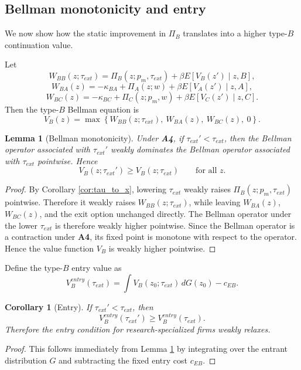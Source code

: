 \documentclass[12pt]{article}
\newtheorem{lemma}{Lemma}
\newtheorem{corollary}{Corollary}
\begin{document}
\subsection{Bellman monotonicity and entry}

We now show how the static improvement in \(\Pi_B\) translates into a higher type-\(B\) continuation value.

Let
\[
W_{BB}(z;\tau_{ext})
=
\Pi_B(z;p_m,\tau_{ext})
+
\beta E[V_B(z')\mid z,B],
\]
\[
W_{BA}(z)
=
-\kappa_{BA}
+
\Pi_A(z;w)
+
\beta E[V_A(z')\mid z,A],
\]
\[
W_{BC}(z)
=
-\kappa_{BC}
+
\Pi_C(z;p_m,w)
+
\beta E[V_C(z')\mid z,C].
\]
Then the type-\(B\) Bellman equation is
\[
V_B(z)
=
\max\left\{
W_{BB}(z;\tau_{ext}),\
W_{BA}(z),\
W_{BC}(z),\
0
\right\}.
\]

\begin{lemma}[Bellman monotonicity]
\label{lem:bellman}
Under \textbf{A4}, if \(\tau_{ext}'<\tau_{ext}\), then the Bellman operator associated with \(\tau_{ext}'\) weakly dominates the Bellman operator associated with \(\tau_{ext}\) pointwise. Hence
\[
V_B(z;\tau_{ext}')\ge V_B(z;\tau_{ext})
\qquad\text{for all } z.
\]
\end{lemma}

\begin{proof}
By Corollary \ref{cor:tau_to_x}, lowering \(\tau_{ext}\) weakly raises \(\Pi_B(z;p_m,\tau_{ext})\) pointwise. Therefore it weakly raises \(W_{BB}(z;\tau_{ext})\), while leaving \(W_{BA}(z)\), \(W_{BC}(z)\), and the exit option unchanged directly. The Bellman operator under the lower \(\tau_{ext}\) is therefore weakly higher pointwise. Since the Bellman operator is a contraction under \textbf{A4}, its fixed point is monotone with respect to the operator. Hence the value function \(V_B\) is weakly higher pointwise.
\end{proof}

Define the type-\(B\) entry value as
\[
V_B^{entry}(\tau_{ext})
=
\int V_B(z_0;\tau_{ext})\,dG(z_0)-c_{EB}.
\]

\begin{corollary}[Entry]
\label{cor:entry}
If \(\tau_{ext}'<\tau_{ext}\), then
\[
V_B^{entry}(\tau_{ext}')\ge V_B^{entry}(\tau_{ext}).
\]
Therefore the entry condition for research-specialized firms weakly relaxes.
\end{corollary}

\begin{proof}
This follows immediately from Lemma \ref{lem:bellman} by integrating over the entrant distribution \(G\) and subtracting the fixed entry cost \(c_{EB}\).
\end{proof}
\end{document}
